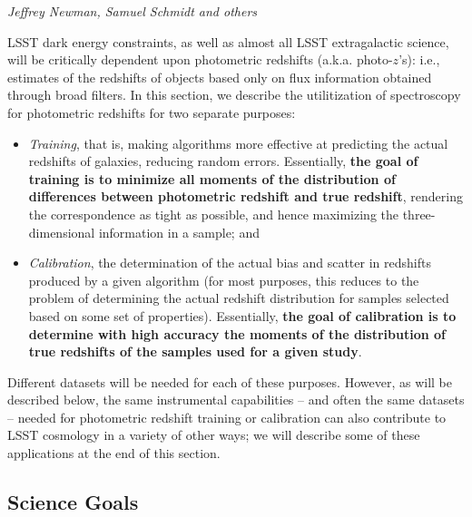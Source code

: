 \label{sec:photoz}

{\it Jeffrey Newman, Samuel Schmidt and others}

LSST dark energy constraints, as well as almost all LSST extragalactic science, will be critically dependent upon photometric redshifts (a.k.a. photo-$z$'s): i.e., estimates of the redshifts of objects based only on flux information obtained through broad filters.  In this section, we describe the utilitization of spectroscopy for photometric redshifts for two separate purposes:
\begin{itemize}
\item {\it Training}, that is, making algorithms more effective at predicting the actual redshifts of galaxies, reducing random errors.  Essentially, {\bf the goal of training is to minimize all moments of the distribution of differences between photometric redshift and true redshift}, rendering the correspondence as tight as possible, and hence maximizing the three-dimensional information in a sample; and
\item {\it Calibration}, the determination of the actual bias and scatter in redshifts produced by a given algorithm (for most purposes, this reduces to the problem of determining the actual redshift distribution for samples selected based on some set of properties).  Essentially, {\bf the goal of calibration is to determine with high accuracy the moments of the distribution of true redshifts of the samples used for a given study}.
\end{itemize}
Different datasets will be needed for each of these purposes.  However, as will be described below, the same instrumental capabilities -- and often the same datasets -- needed for photometric redshift training or calibration can also contribute to LSST cosmology in a variety of other ways; we will describe some of these applications at the end of this section.






\subsection{Science Goals}
%

